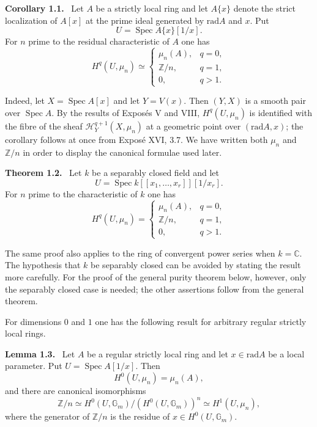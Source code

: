 \documentclass[12pt]{article}
\newcommand{\ZZ}{\mathbb Z}
\newcommand{\CC}{\mathbb C}
\newcommand{\GG}{\mathbb G}
\DeclareMathOperator{\Spec}{Spec}
\newcommand{\rad}{\mathrm{rad}}
\newenvironment{statement}[1]{\par\medskip\noindent\textbf{#1.}\ }{\par\medskip}
\begin{document}
\begin{statement}{Corollary 1.1}
Let $A$ be a strictly local ring and let $A\{x\}$ denote the strict localization of $A[x]$ at the prime ideal generated by $\rad A$ and $x$. Put
\[
   U=\Spec A\{x\}[1/x].
\]
For $n$ prime to the residual characteristic of $A$ one has
\[
H^q(U,\mu_n)\simeq
\begin{cases}
\mu_n(A),&q=0,\\
\ZZ/n,&q=1,\\
0,&q>1.
\end{cases}
\]
\end{statement}

Indeed, let $X=\Spec A[x]$ and let $Y=V(x)$. Then $(Y,X)$ is a smooth pair over $\Spec A$. By the results of Expos\'es V and VIII, $H^q(U,\mu_n)$ is identified with the fibre of the sheaf $\mathcal H_Y^{q+1}(X,\mu_n)$ at a geometric point over $(\rad A,x)$; the corollary follows at once from Expos\'e XVI, 3.7. We have written both $\mu_n$ and $\ZZ/n$ in order to display the canonical formulae used later.

\begin{statement}{Theorem 1.2}
Let $k$ be a separably closed field and let
\[
   U=\Spec k[[x_1,\ldots,x_r]][1/x_r].
\]
For $n$ prime to the characteristic of $k$ one has
\[
H^q(U,\mu_n)=
\begin{cases}
\mu_n(A),&q=0,\\
\ZZ/n,&q=1,\\
0,&q>1.
\end{cases}
\]
\end{statement}

The same proof also applies to the ring of convergent power series when $k=\CC$. The hypothesis that $k$ be separably closed can be avoided by stating the result more carefully. For the proof of the general purity theorem below, however, only the separably closed case is needed; the other assertions follow from the general theorem.

For dimensions $0$ and $1$ one has the following result for arbitrary regular strictly local rings.

\begin{statement}{Lemma 1.3}
Let $A$ be a regular strictly local ring and let $x\in \rad A$ be a local parameter. Put $U=\Spec A[1/x]$. Then
\[
   H^0(U,\mu_n)=\mu_n(A),
\]
and there are canonical isomorphisms
\[
   \ZZ/n\simeq H^0(U,\GG_m)/(H^0(U,\GG_m))^n
       \simeq H^1(U,\mu_n),
\]
where the generator of $\ZZ/n$ is the residue of $x\in H^0(U,\GG_m)$.
\end{statement}
\end{document}

